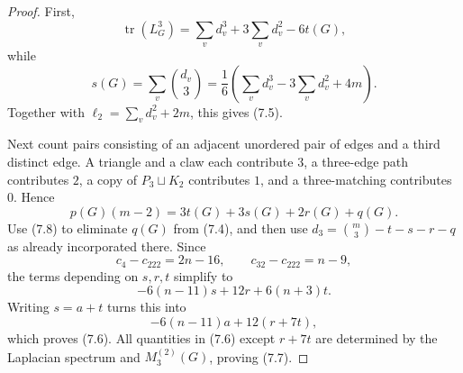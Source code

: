 \documentclass[10pt,a4paper]{amsart}
\newcommand{\tr}{\operatorname{tr}}
\begin{document}
\begin{proof}
First,
\[
\tr(L_G^3)=\sum_v d_v^3+3\sum_vd_v^2-6t(G),
\]
while
\[
s(G)=\sum_v\binom{d_v}{3}
=\frac{1}{6}\left(\sum_vd_v^3-3\sum_vd_v^2+4m\right).
\]
Together with $\ell_2=\sum_vd_v^2+2m$, this gives (7.5).

Next count pairs consisting of an adjacent unordered pair of edges and a
third distinct edge.  A triangle and a claw each contribute $3$, a
three-edge path contributes $2$, a copy of $P_3\sqcup K_2$ contributes $1$,
and a three-matching contributes $0$.  Hence
\[
p(G)(m-2)=3t(G)+3s(G)+2r(G)+q(G).
\tag{7.8}
\]
Use (7.8) to eliminate $q(G)$ from (7.4), and then use
$d_3=\binom m3-t-s-r-q$ as already incorporated there.  Since
\[
c_4-c_{222}=2n-16,\qquad
c_{32}-c_{222}=n-9,
\]
the terms depending on $s,r,t$ simplify to
\[
-6(n-11)s+12r+6(n+3)t.
\]
Writing $s=a+t$ turns this into
\[
-6(n-11)a+12(r+7t),
\]
which proves (7.6).  All quantities in (7.6) except $r+7t$ are determined
by the Laplacian spectrum and $M_3^{(2)}(G)$, proving (7.7).
\end{proof}
\end{document}
